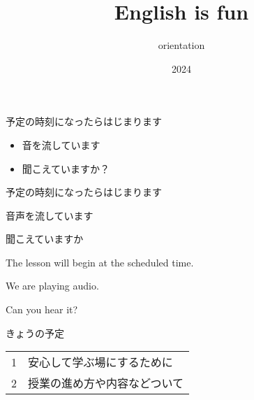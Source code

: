 \documentclass[
  ignorenonframetext,
  aspectratio=169,
  xcolor=dvipsnames]{beamer}
\title{English is fun}
\subtitle{orientation}
\author{}
\date{\vspace{-2.5em}2024}
\begin{document}
\frame{\titlepage}{}

\begin{frame}[plain]
 \LARGE

予定の時刻になったらはじまります

\Large
\begin{itemize}
 \item 音を流しています
 \item 聞こえていますか？
\end{itemize}
\end{frame}

\frame{\titlepage}{}

\begin{frame}{}
\label{section}
\thispagestyle{empty}
\Large

\raggedright

予定の時刻になったらはじまります

\textbullet  音声を流しています

\textbullet  聞こえていますか　

\vfill

\raggedleft

The lesson will begin at the scheduled time.

\vspace{-6pt}

We are playing audio.

\vspace{-6pt}

Can you hear it?
\end{frame}

\begin{frame}{}
\label{section-1}
\thispagestyle{empty}
\titlepage
\end{frame}

\begin{frame}{きょうの予定}
\label{ux304dux3087ux3046ux306eux4e88ux5b9a}
\thispagestyle{empty}
\LARGE

\begin{tabular}{rl}
1&安心して学ぶ場にするために\\
2&授業の進め方や内容などついて
\end{tabular}
\end{frame}
\end{document}
